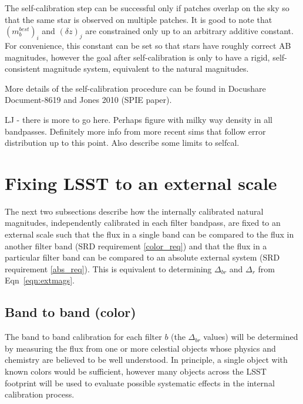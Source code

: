 \documentclass[12pt,preprint]{aastex}
\begin{document}
The self-calibration step can be successful only if patches
overlap on the sky so that the same star is observed on 
multiple patches. It is good to note that $(m_b^{best})_{i}$ and 
$(\delta z)_j$ are constrained only up to an arbitrary 
additive constant. For convenience, this constant can be set so that
stars have roughly correct AB magnitudes, however the goal after
self-calibration is only to have a rigid, self-consistent magnitude
system, equivalent to the natural magnitudes.

More details of the self-calibration procedure can be found in
Docushare Document-8619 and Jones 2010 (SPIE paper). 


LJ - there is more to go here. Perhaps figure with milky way density 
in all bandpasses.  Definitely more info from more recent sims
that follow error distribution up to this point. Also describe some 
limits to selfcal. 

\section{Fixing LSST to an external scale}
\label{sec:calib_external}

The next two subsections describe how the internally calibrated
natural magnitudes, independently calibrated in each filter bandpass, are fixed
to an external scale such that the flux in a single band can be compared to the
flux in another filter band (SRD requirement \ref{color_req}) and that
the flux in a particular filter band can be compared to an absolute
external system (SRD requirement \ref{abs_req}). This is equivalent to
determining $\Delta_{br}$ and $\Delta_r$ from Eqn~\ref{eqn:extmags}. 

\subsection{Band to band (color)}

The band to band calibration for each filter $b$ (the $\Delta_{br}$
values) will be determined by measuring the flux from one or more
celestial objects whose physics and chemistry are believed to be well
understood. In principle, a single object with known colors would be
sufficient, however many objects across the LSST footprint
will be used to evaluate possible systematic effects in the internal
calibration process. 
\end{document}
